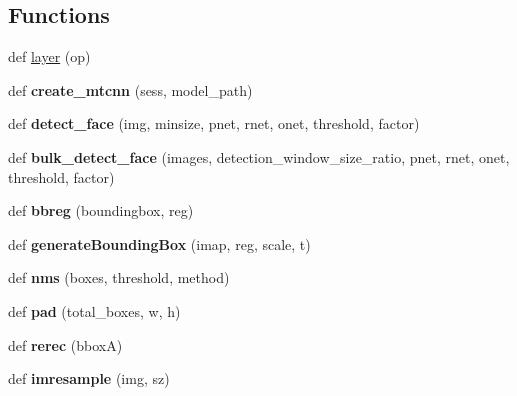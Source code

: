 \subsection*{Functions}
\begin{DoxyCompactItemize}
\item 
def \hyperlink{namespacedetect__face_a56206197555d7b54d5f27c410d814268}{layer} (op)
\item 
def {\bfseries create\+\_\+mtcnn} (sess, model\+\_\+path)\hypertarget{namespacedetect__face_a9a159b63bb8dfd9836c1a5a401d82acc}{}\label{namespacedetect__face_a9a159b63bb8dfd9836c1a5a401d82acc}

\item 
def {\bfseries detect\+\_\+face} (img, minsize, pnet, rnet, onet, threshold, factor)\hypertarget{namespacedetect__face_a114ff784601bf295b09cbda8e43c1f40}{}\label{namespacedetect__face_a114ff784601bf295b09cbda8e43c1f40}

\item 
def {\bfseries bulk\+\_\+detect\+\_\+face} (images, detection\+\_\+window\+\_\+size\+\_\+ratio, pnet, rnet, onet, threshold, factor)\hypertarget{namespacedetect__face_a03662ace7b5ad080897d8fad2213e2ea}{}\label{namespacedetect__face_a03662ace7b5ad080897d8fad2213e2ea}

\item 
def {\bfseries bbreg} (boundingbox, reg)\hypertarget{namespacedetect__face_a8d2a300cd87264905d5edd788c4d1a35}{}\label{namespacedetect__face_a8d2a300cd87264905d5edd788c4d1a35}

\item 
def {\bfseries generate\+Bounding\+Box} (imap, reg, scale, t)\hypertarget{namespacedetect__face_a1fd06dbdc98718c9e9e05636c22864ce}{}\label{namespacedetect__face_a1fd06dbdc98718c9e9e05636c22864ce}

\item 
def {\bfseries nms} (boxes, threshold, method)\hypertarget{namespacedetect__face_a2e44d4e2710d931d974bbfc4237e5964}{}\label{namespacedetect__face_a2e44d4e2710d931d974bbfc4237e5964}

\item 
def {\bfseries pad} (total\+\_\+boxes, w, h)\hypertarget{namespacedetect__face_adb76cb941cd3edc02296995e3d0759ca}{}\label{namespacedetect__face_adb76cb941cd3edc02296995e3d0759ca}

\item 
def {\bfseries rerec} (bboxA)\hypertarget{namespacedetect__face_acfe26effdb21d6424211964e67974e2c}{}\label{namespacedetect__face_acfe26effdb21d6424211964e67974e2c}

\item 
def {\bfseries imresample} (img, sz)\hypertarget{namespacedetect__face_ad0751aa76758f14c208ff91a53a90b9a}{}\label{namespacedetect__face_ad0751aa76758f14c208ff91a53a90b9a}

\end{DoxyCompactItemize}


